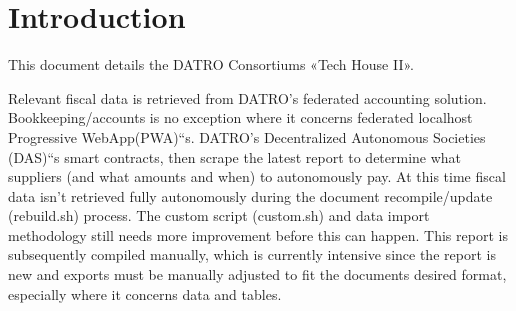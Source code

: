 \documentclass[letterpaper,10pt,openany,oneside,russian]{sphinxmanual}
\begin{document}
\chapter{Introduction}
\label{\detokenize{introduction:introduction}}\label{\detokenize{introduction::doc}}
\sphinxAtStartPar
This document details the DATRO Consortiums «Tech House II».

\sphinxAtStartPar
Relevant fiscal data is retrieved from DATRO’s federated accounting solution. Bookkeeping/accounts is no exception where it concerns federated localhost Progressive WebApp(PWA)“s.
DATRO’s Decentralized Autonomous Societies (DAS)“s smart contracts, then scrape the latest report to determine what suppliers (and what amounts and when) to autonomously pay.
At this time fiscal data isn’t retrieved fully autonomously during the document re\sphinxhyphen{}compile/update (rebuild.sh) process.
The custom script (custom.sh) and data import methodology still needs more improvement before this can happen.
This report is subsequently compiled manually, which is currently intensive since the report is new and exports must be manually adjusted to fit the documents desired format, especially where it concerns data and tables.
\end{document}
